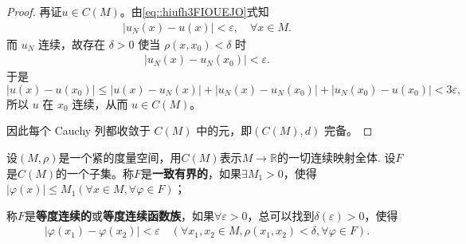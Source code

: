 \documentclass[../../main.tex]{subfiles}%
\begin{document}
\begin{proof}
再证$u\in C(M)$。由\eqref{eq::hiufh3FIOUEJO}式知
\begin{align*}
|u_N(x)-u(x)|<\varepsilon,\quad \forall x\in M.
\end{align*}
而 $u_N$ 连续，故存在 $\delta>0$ 使当 $\rho(x,x_0)<\delta$ 时 
\begin{align*}
|u_N(x)-u_N(x_0)|<\varepsilon.
\end{align*}
于是
\[
|u(x)-u(x_0)|\leqslant |u(x)-u_N(x)|+|u_N(x)-u_N(x_0)|+|u_N(x_0)-u(x_0)|<3\varepsilon,
\]
所以 $u$ 在 $x_0$ 连续，从而 $u\in C(M)$。

因此每个 Cauchy 列都收敛于 $C(M)$ 中的元，即$(C(M),d)$ 完备。
\end{proof}

\begin{definition}
设$(M,\rho)$是一个紧的度量空间，用$C(M)$表示$M\to\mathbb{R}$的一切连续映射全体.
设$F$是$C(M)$的一个子集。称$F$是\textbf{一致有界的}，如果$\exists M_1>0$，使得$|\varphi(x)|\leqslant M_1(\forall x\in M,\forall\varphi\in F)$；

称$F$是\textbf{等度连续的}或\textbf{等度连续函数族}，如果$\forall\varepsilon>0$，总可以找到$\delta(\varepsilon)>0$，使得
\begin{align*}
|\varphi(x_1)-\varphi(x_2)|<\varepsilon\quad (\forall x_1,x_2\in M,\rho(x_1,x_2)<\delta,\forall\varphi\in F).
\end{align*}
\end{definition}
\end{document}
